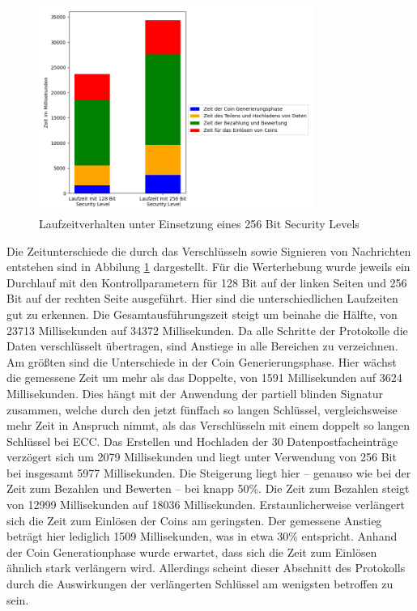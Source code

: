\documentclass[
	fontsize=12pt,
	headings=small,
	parskip=half,           %
	bibliography=totoc,
	numbers=noenddot,       %
	open=any,               %
]{scrreprt}
\begin{document}
\begin{figure}[h]
    \caption{Laufzeitverhalten unter Einsetzung eines 256 Bit Security Levels}
    \label{fig:win_256bit}
    \centering
    \includegraphics[width=0.8\textwidth]{figure_win_256Bit.png}
\end{figure}
Die Zeitunterschiede die durch das Verschlüsseln sowie Signieren von Nachrichten entstehen sind in Abbilung \ref{fig:win_256bit} dargestellt. Für die Werterhebung wurde jeweils ein Durchlauf mit den Kontrollparametern für 128 Bit auf der linken Seiten und 256 Bit auf der rechten Seite ausgeführt. Hier sind die unterschiedlichen Laufzeiten gut zu erkennen. Die Gesamtausführungszeit steigt um beinahe die Hälfte, von 23713 Millisekunden auf 34372 Millisekunden. Da alle Schritte der Protokolle die Daten verschlüsselt übertragen, sind Anstiege in alle Bereichen zu verzeichnen. Am größten sind die Unterschiede in der Coin Generierungsphase. Hier wächst die gemessene Zeit um mehr als das Doppelte, von 1591 Millisekunden auf 3624 Millisekunden. Dies hängt mit der Anwendung der partiell blinden Signatur zusammen, welche durch den jetzt fünffach so langen Schlüssel, vergleichsweise mehr Zeit in Anspruch nimmt, als das Verschlüsseln mit einem doppelt so langen Schlüssel bei ECC. Das Erstellen und Hochladen der 30 Datenpostfacheinträge verzögert sich um 2079 Millisekunden und liegt unter Verwendung von 256 Bit bei insgesamt 5977 Millisekunden. Die Steigerung liegt hier -- genauso wie bei der Zeit zum Bezahlen und Bewerten -- bei knapp 50\%. Die Zeit zum Bezahlen steigt von 12999 Millisekunden auf 18036 Millisekunden. Erstaunlicherweise verlängert sich die Zeit zum Einlösen der Coins am geringsten. Der gemessene Anstieg beträgt hier lediglich 1509 Millisekunden, was in etwa 30\% entspricht. Anhand der Coin Generationphase wurde erwartet, dass sich die Zeit zum Einlösen ähnlich stark verlängern wird. Allerdings scheint dieser Abschnitt des Protokolls durch die Auswirkungen der verlängerten Schlüssel am wenigsten betroffen zu sein.
\end{document}
